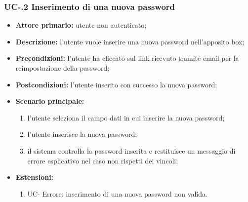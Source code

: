 \subsubsection{UC-.2 Inserimento di una nuova password}
\begin{itemize}
	\item \textbf{Attore primario:} utente non autenticato;

	\item \textbf{Descrizione:} l'utente vuole inserire una nuova password nell'apposito box;

	\item \textbf{Precondizioni:} l'utente ha cliccato sul link ricevuto tramite email per la reimpostazione della password;

	\item \textbf{Postcondizioni:} l'utente inserito con successo la nuova password;

	\item \textbf{Scenario principale:}
	      \begin{enumerate}
		      \item l'utente seleziona il campo dati in cui inserire la nuova password;
		      \item l'utente inserisce la nuova password;
		      \item il sistema controlla la password inserita e restituisce un messaggio di errore esplicativo nel caso non rispetti dei vincoli;
	      \end{enumerate}
	\item \textbf{Estensioni:}
	      \begin{enumerate}
		      \item UC- Errore: inserimento di una nuova password non valida.
	      \end{enumerate}
\end{itemize}

